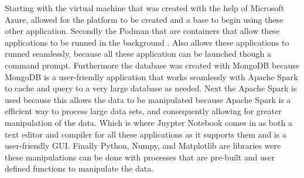 \documentclass[conference,twoside]{IEEEtran}
\begin{document}
Starting with the virtual machine that was created with the help of Microsoft Azure, allowed for the platform to be created and a base to begin using these other application. Secondly the Podman that are containers that allow these applications to be runned in the background . Also allows these applications to runned seamlessly, because all these application can be launched though a command prompt. Furthermore the database was created with MongoDB because MongoDB is a user-friendly application that works seamlessly with Apache Spark to cache and query to a very large database as needed. Next the Apache Spark is used because this allows the data to be manipulated because Apache Spark is a efficient way to process large data sets, and consequently allowing for greater manipulation of the data. Which is where Juypter Notebook comes in as both a text editor and compiler for all these applications as it supports them and is a user-friendly GUI. Finally Python, Numpy, and Matplotlib are libraries were these manipulations can be done with processes that are pre-built and user defined functions to manipulate the data.

\end{document}
